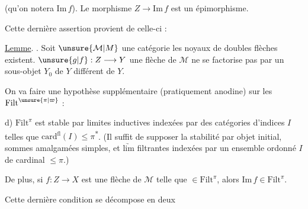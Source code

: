 
(qu'on notera $\mathrm{Im}\,f$). Le morphisme
$Z\longrightarrow\mathrm{Im}\,f$ est un épimorphisme.

Cette dernière assertion  provient de
celle-ci :

\uline{Lemme}. . Soit  $\unsure{\mathcal M|M}$ une catégorie
 les noyaux de doubles flèches existent.
 $\unsure{g|f}:Z\longrightarrow Y$ une flèche de $\mathcal M$  \inserted{Alors $g$ est épi \unsure{ssi} $\unsure{\exists|]}$, $g$}
ne se factorise pas par un sous-objet  $Y_0$ de $Y$ différent de $Y$.


On va faire une hypothèse supplémentaire
(pratiquement anodine) sur les
$\mathrm{Filt}^{\unsure{\pi|\varpi}}$\deleted{\unsure{,}} :

d) $\mathrm{Filt}^{\pi}$ est stable par limites inductives
indexées par des catégories d'indices $I$
telles que $\mathrm{card}^{\mathrm{fl}}(I)\leq\pi$\textsuperscript{*}. (Il suffit de
supposer la stabilité par objet initial, sommes
amalgamées simples, et $\underrightarrow{\mathrm{lim}}$ filtrantes indexées
par un ensemble ordonné $I$ de cardinal $\leq\pi$.)

De plus, si $f:Z\longrightarrow X$ est une flèche
de $\mathcal M$ telle que   $\in\mathrm{Filt}^{\pi}$, alors $\mathrm{Im}\,f\in\mathrm{Filt}^{\pi}$.

Cette dernière condition  
 se décompose en
deux

